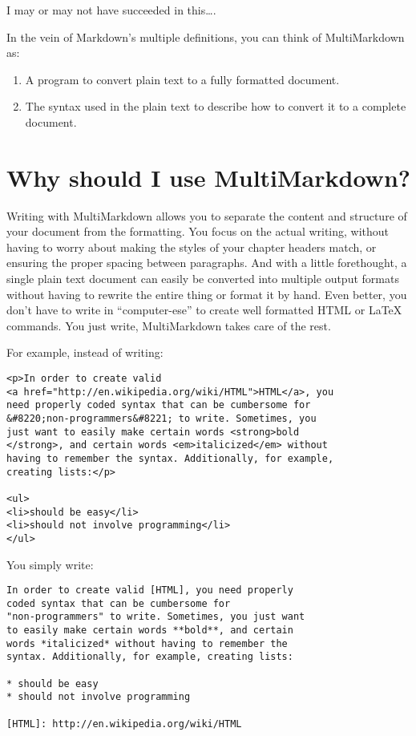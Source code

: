 I may or may not have succeeded in this{\ldots}.

In the vein of Markdown's multiple definitions, you can think of MultiMarkdown as:

\begin{enumerate}
\item A program to convert plain text to a fully formatted document.

\item The syntax used in the plain text to describe how to convert it to a complete document.

\end{enumerate}

\section{Why should I use MultiMarkdown? }
\label{whyshouldiusemultimarkdown}

Writing with MultiMarkdown allows you to separate the content and structure of your document from the formatting. You focus on the actual writing, without having to worry about making the styles of your chapter headers match, or ensuring the proper spacing between paragraphs. And with a little forethought, a single plain text document can easily be converted into multiple output formats without having to rewrite the entire thing or format it by hand. Even better, you don't have to write in ``computer-ese'' to create well formatted HTML or LaTeX commands. You just write, MultiMarkdown takes care of the rest.

For example, instead of writing:

\begin{verbatim}
<p>In order to create valid 
<a href="http://en.wikipedia.org/wiki/HTML">HTML</a>, you 
need properly coded syntax that can be cumbersome for 
&#8220;non-programmers&#8221; to write. Sometimes, you
just want to easily make certain words <strong>bold
</strong>, and certain words <em>italicized</em> without
having to remember the syntax. Additionally, for example,
creating lists:</p>

<ul>
<li>should be easy</li>
<li>should not involve programming</li>
</ul>
\end{verbatim}

You simply write:

\begin{verbatim}
In order to create valid [HTML], you need properly
coded syntax that can be cumbersome for 
"non-programmers" to write. Sometimes, you just want
to easily make certain words **bold**, and certain 
words *italicized* without having to remember the 
syntax. Additionally, for example, creating lists:

* should be easy
* should not involve programming

[HTML]: http://en.wikipedia.org/wiki/HTML
\end{verbatim}

